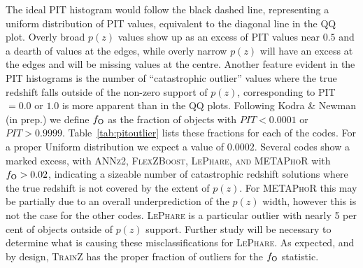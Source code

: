 \documentclass[usenatbib]{mn2e}
\begin{document}
The ideal PIT histogram would follow the black dashed line, representing a uniform distribution of PIT values, equivalent to the diagonal line in the QQ plot.
Overly broad $p(z)$ values show up as an excess of PIT values near $0.5$ and a dearth of values at the edges, while overly narrow $p(z)$ will have an excess at the edges and will be missing values at the centre.
Another feature evident in the PIT histograms is the number of ``catastrophic outlier'' values where the true redshift falls outside of the non-zero support of $p(z)$, corresponding to PIT$=0.0$ or $1.0$ is more apparent than in the QQ plots.  Following Kodra \& Newman (in prep.) we define $f_{\rm O}$ as the fraction of objects with $PIT<0.0001$ or $PIT>0.9999$.  Table~\ref{tab:pitoutlier} lists these fractions for each of the codes. For a proper Uniform distribution we expect a value of $0.0002$.  Several codes show a marked excess, with \textsc{ANNz2, FlexZBoost, LePhare, and METAPhoR} with $f_{\rm O} > 0.02$, indicating a sizeable number of catastrophic redshift solutions where the true redshift is not covered by the extent of $p(z)$.  For \textsc{METAPhoR} this may be partially due to an overall underprediction of the $p(z)$ width, however this is not the case for the other codes.  \textsc{LePhare} is a particular outlier with nearly 5 per cent of objects outside of $p(z)$ support.  Further study will be necessary to determine what is causing these misclassifications for \textsc{LePhare}.  As expected, and by design, \textsc{TrainZ} has the proper fraction of outliers for the $f_{\rm O}$ statistic.
\end{document}
